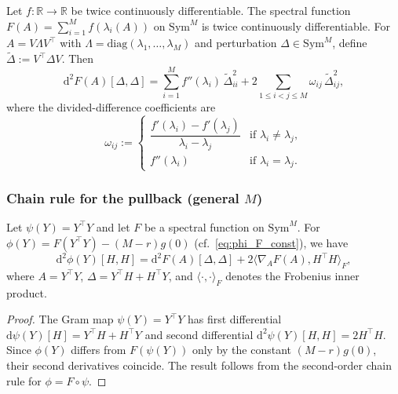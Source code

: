 \begin{theorem}
\label{thm:lewis_sendov}
Let $f: \mathbb{R} \to \mathbb{R}$ be twice continuously differentiable. The spectral function $F(A) = \sum_{i=1}^{M} f(\lambda_i(A))$ on $\mathrm{Sym}^M$ is twice continuously differentiable. For $A = V \Lambda V^\top$ with $\Lambda = \mathrm{diag}(\lambda_1, \ldots, \lambda_M)$ and perturbation $\Delta \in \mathrm{Sym}^M$, define $\tilde{\Delta} := V^\top \Delta V$. Then
\begin{equation}
\mathrm{d}^2 F(A)[\Delta, \Delta] = \sum_{i=1}^{M} f''(\lambda_i) \, \tilde{\Delta}_{ii}^2 + 2 \sum_{1 \leq i < j \leq M} \omega_{ij} \, \tilde{\Delta}_{ij}^2,
\end{equation}
where the divided-difference coefficients are
\begin{equation}
\omega_{ij} := \begin{cases} \dfrac{f'(\lambda_i) - f'(\lambda_j)}{\lambda_i - \lambda_j} & \text{if } \lambda_i \neq \lambda_j, \\[10pt] f''(\lambda_i) & \text{if } \lambda_i = \lambda_j. \end{cases}
\end{equation}
\end{theorem}

\subsubsection{Chain rule for the pullback (general $M$)}

\begin{proposition}
\label{prop:chain_rule}
Let $\psi(Y)=Y^\top Y$ and let $F$ be a spectral function on $\mathrm{Sym}^M$.  For $\phi(Y)=F(Y^\top Y)-(M-r)g(0)$ (cf.~\eqref{eq:phi_F_const}), we have
\begin{equation}
\mathrm{d}^2 \phi(Y)[H, H] = \mathrm{d}^2 F(A)[\Delta, \Delta] + 2 \langle \nabla_A F(A), H^\top H \rangle_F,
\end{equation}
where $A = Y^\top Y$, $\Delta = Y^\top H + H^\top Y$, and $\langle \cdot, \cdot \rangle_F$ denotes the Frobenius inner product.
\end{proposition}

\begin{proof}
The Gram map $\psi(Y) = Y^\top Y$ has first differential $\mathrm{d}\psi(Y)[H] = Y^\top H + H^\top Y$ and second differential $\mathrm{d}^2 \psi(Y)[H, H] = 2 H^\top H$. Since $\phi(Y)$ differs from $F(\psi(Y))$ only by the constant $(M-r)g(0)$, their second derivatives coincide. The result follows from the second-order chain rule for $\phi = F \circ \psi$.
\end{proof}

